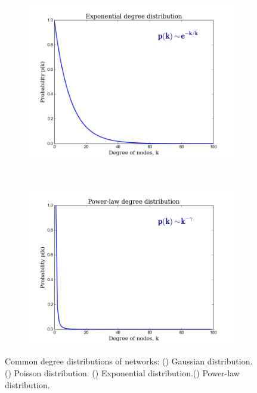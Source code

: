 \documentclass[10pt,a4paper]{article}
\theoremstyle{plain}
\theoremstyle{definition}
\begin{document}
\begin{figure}[H]
\begin{subfigure}[b]{0.45\textwidth}
		\includegraphics[width=\textwidth]{images/exp.png}
		\caption{}
		\label{expo}
	\end{subfigure}~
	\begin{subfigure}[b]{0.45\textwidth}
		\includegraphics[width=\textwidth]{images/p-law.png}
		\caption{}
		\label{powerlaw}
	\end{subfigure}
	\caption{Common degree distributions of networks: () Gaussian distribution. () Poisson distribution. () Exponential distribution.() Power-law distribution.}
	\label{distribution}
\end{figure} 
\end{document}
